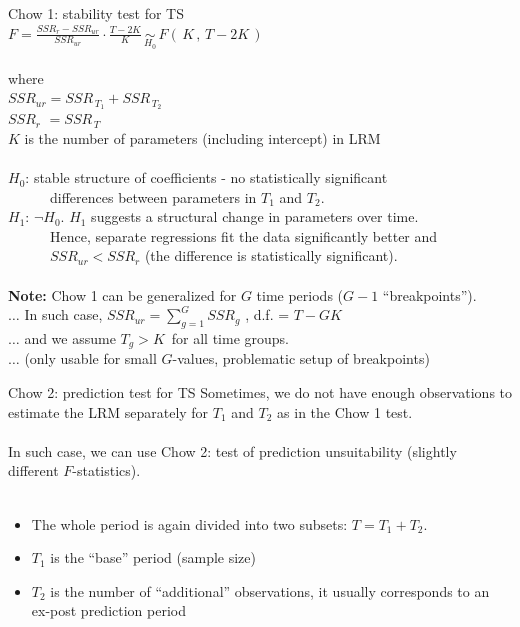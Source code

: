 \documentclass{beamer}
\begin{document}
\begin{frame}{Chow 1: stability test for TS}
~\\
$F = \frac{\textit{SSR}_{r}-\textit{SSR}_{ur}}{\textit{SSR}_{ur}}
   \cdot \frac{T-2K}{K} \,
   \underset{H_0}{\sim} \,
   F(\,K \,,\, T\!-\!2K \, ) $ \\
~ \\
where\\
$\textit{SSR}_{ur} = \textit{SSR}_{\,T_1} + \textit{SSR}_{\,T_2} $\\
$\textit{SSR}_{r} \,\,= \textit{SSR}_{\,T}$\\
$K$ is the number of parameters (including intercept) in LRM\\
~ \\
$H_0$: stable structure of coefficients - no statistically significant\\ 
~~~~~~differences between parameters in $T_1$ and $T_2$.\\
$H_1$: $\neg H_0$. $H_1$ suggests a structural change in parameters over time.\\ 
~~~~~~Hence, separate regressions fit the data significantly better and\\
~~~~~~$\textit{SSR}_{ur} < \textit{SSR}_{r}$ (the difference is statistically significant).\\
~ \\
\footnotesize{
\textbf{Note:} Chow 1 can be generalized for $G$ time periods ($G-1$ ``breakpoints'').\\
$\dots$ In such case, $\textit{SSR}_{ur}= \sum_{g=1}^G \! \textit{SSR}_{g} $ , d.f. = $T-GK$ \\
$\dots$ and we assume $T_g > K \,$ for all time groups.\\
$\dots$ (only usable for small $G$-values, problematic setup of breakpoints)
}
\end{frame}
\begin{frame}{Chow 2: prediction test for TS}
Sometimes, we do not have enough observations to estimate the LRM separately for $T_1$ and $T_2$ as in the Chow 1 test.\\
~\\
In such case, we can use Chow 2: test of prediction unsuitability (slightly different $F$-statistics). \\
~\\
\begin{itemize}
\item The whole period is again divided into two subsets: $T = T_1 + T_2$. 
\item $T_1$ is the ``base'' period (sample size)
\item $T_2$ is the number of ``additional'' observations, it usually corresponds to an ex-post prediction period
\end{itemize}
\end{frame}
\end{document}
